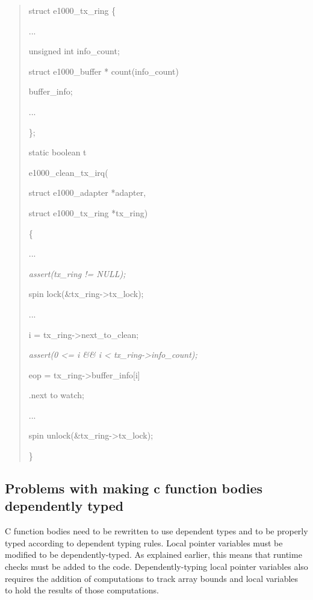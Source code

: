 \documentclass[]{article}
\begin{document}
\begin{quote}
struct e1000\_tx\_ring \{

...

unsigned int info\_count;

struct e1000\_buffer * count(info\_count)

buffer\_info;

...

\};

static boolean t

e1000\_clean\_tx\_irq(

struct e1000\_adapter *adapter,

struct e1000\_tx\_ring *tx\_ring)

\{

...

\emph{assert(tx\_ring != NULL);}

spin lock(\&tx\_ring-\textgreater{}tx\_lock);

...

i = tx\_ring-\textgreater{}next\_to\_clean;

\emph{assert(0 \textless{}= i \&\& i \textless{}
tx\_ring-\textgreater{}info\_count);}

eop = tx\_ring-\textgreater{}buffer\_info{[}i{]}

.next to watch;

...

spin unlock(\&tx\_ring-\textgreater{}tx\_lock);

\}
\end{quote}

\subsection{\texorpdfstring{\protect\hypertarget{ux5fToc422906949}{}{\protect\hypertarget{ux5fToc424307672}{}{\protect\hypertarget{ux5fToc426641128}{}{\protect\hypertarget{ux5fToc435435003}{}{\protect\hypertarget{ux5fToc437460836}{}{\protect\hypertarget{ux5fToc440445517}{}{\protect\hypertarget{ux5fToc440449299}{}{\protect\hypertarget{ux5fToc440551949}{}{\protect\hypertarget{ux5fRef414888397}{}{\protect\hypertarget{ux5fToc420589168}{}{}}}}}}}}}}Problems
with making c function bodies dependently typed
}{Problems with making c function bodies dependently typed }}\label{problems-with-making-c-function-bodies-dependently-typed}

C function bodies need to be rewritten to use dependent types and to be
properly typed according to dependent typing rules. Local pointer
variables must be modified to be dependently-typed. As explained
earlier, this means that runtime checks must be added to the code.
Dependently-typing local pointer variables also requires the addition of
computations to track array bounds and local variables to hold the
results of those computations.
\end{document}
